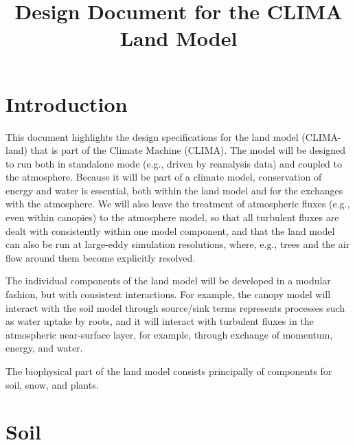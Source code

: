 \documentclass{article}
\title{Design Document for the CLIMA Land Model}
\author{ }
\begin{document}
\maketitle
\tableofcontents

\section{Introduction}\label{s:introduction}

This document highlights the design specifications for the land model (CLIMA-land) that is part of the Climate Machine (CLIMA). The model will be designed to run both in standalone mode (e.g., driven by reanalysis data) and coupled to the atmosphere. Because it will be part of a climate model, conservation of energy and water is essential, both within the land model and for the exchanges with the atmosphere. We will also leave the treatment of atmospheric fluxes (e.g., even within canopies) to the atmosphere model, so that all turbulent fluxes are dealt with consistently within one model component, and that the land model can also be run at large-eddy simulation resolutions, where, e.g., trees and the air flow around them become explicitly resolved. 

The individual components of the land model will be developed in a modular fashion, but with consistent interactions. For example, the canopy model will interact with the soil model through source/sink terms represents processes such as water uptake by roots, and it will interact with turbulent fluxes in the atmospheric near-surface layer, for example, through exchange of momentum, energy, and water. 

The biophysical part of the land model consists principally of components for soil, snow, and plants.


\section{Soil}
\end{document}
